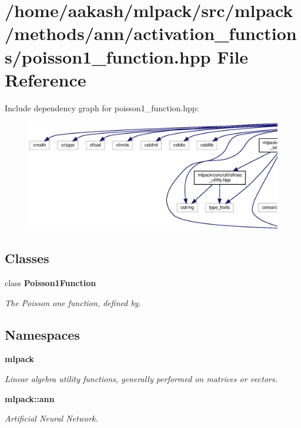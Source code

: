 \section{/home/aakash/mlpack/src/mlpack/methods/ann/activation\+\_\+functions/poisson1\+\_\+function.hpp File Reference}
\label{poisson1__function_8hpp}
Include dependency graph for poisson1\+\_\+function.\+hpp\+:
\nopagebreak
\begin{figure}[H]
\begin{center}
\leavevmode
\includegraphics[width=350pt]{poisson1__function_8hpp__incl}
\end{center}
\end{figure}
\subsection*{Classes}
\begin{DoxyCompactItemize}
\item 
class \textbf{ Poisson1\+Function}
\begin{DoxyCompactList}\small\item\em The Poisson one function, defined by. \end{DoxyCompactList}\end{DoxyCompactItemize}
\subsection*{Namespaces}
\begin{DoxyCompactItemize}
\item 
 \textbf{ mlpack}
\begin{DoxyCompactList}\small\item\em Linear algebra utility functions, generally performed on matrices or vectors. \end{DoxyCompactList}\item 
 \textbf{ mlpack\+::ann}
\begin{DoxyCompactList}\small\item\em Artificial Neural Network. \end{DoxyCompactList}\end{DoxyCompactItemize}
